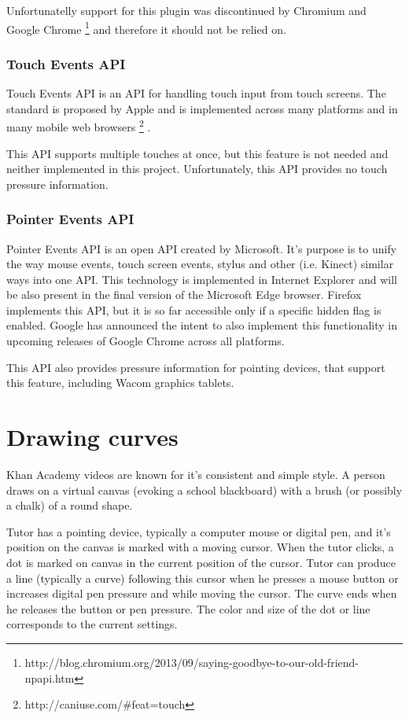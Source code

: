 Unfortunatelly support for this plugin was discontinued by Chromium and Google Chrome \footnote{http://blog.chromium.org/2013/09/saying-goodbye-to-our-old-friend-npapi.htm} and therefore it should not be relied on.

\subsubsection{Touch Events API}
Touch Events API is an API for handling touch input from touch screens. The standard is proposed by Apple and is implemented across many platforms and in many mobile web browsers \footnote{http://caniuse.com/\#feat=touch} \cite{}.

This API supports multiple touches at once, but this feature is not needed and neither implemented in this project. Unfortunately, this API provides no touch pressure information.

\subsubsection{Pointer Events API}
Pointer Events API is an open API created by Microsoft. It's purpose is to unify the way mouse events, touch screen events, stylus and other (i.e. Kinect) similar ways into one API. This technology is implemented in Internet Explorer and will be also present in the final version of the Microsoft Edge browser. Firefox implements this API, but it is so far accessible only if a specific hidden flag is enabled. Google has announced the intent to also implement this functionality in upcoming releases of Google Chrome across all platforms.

This API also provides pressure information for pointing devices, that support this feature, including Wacom graphics tablets.


\section{Drawing curves}
Khan Academy videos are known for it's consistent and simple style. A person draws on a virtual canvas (evoking a school blackboard) with a brush (or possibly a chalk) of a round shape.

Tutor has a pointing device, typically a computer mouse or digital pen, and it's position on the canvas is marked with a moving cursor. When the tutor clicks, a dot is marked on canvas in the current position of the cursor. Tutor can produce a line (typically a curve) following this cursor when he presses a mouse button or increases digital pen pressure and while moving the cursor. The curve ends when he releases the button or pen pressure. The color and size of the dot or line corresponds to the current settings.

